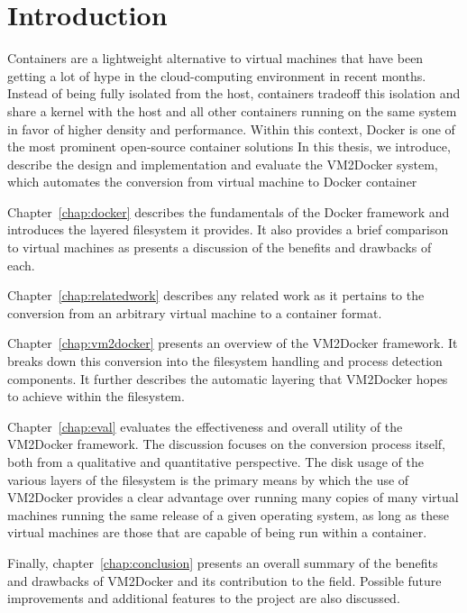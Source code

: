 \chapter{Introduction}

Containers are a lightweight alternative to virtual machines that have been getting a lot of hype in the cloud-computing environment in recent months. Instead of being fully isolated from the host, containers tradeoff this isolation and share a kernel with the host and all other containers running on the same system in favor of higher density and performance. Within this context, Docker is one of the most prominent open-source container solutions In this thesis, we introduce, describe the design and implementation and evaluate the VM2Docker system, which automates the conversion from virtual machine to Docker container

Chapter~\ref{chap:docker} describes the fundamentals of the Docker framework and introduces the layered filesystem it provides. It also provides a brief comparison to virtual machines as presents a discussion of the benefits and drawbacks of each.

Chapter~\ref{chap:relatedwork} describes any related work as it pertains to the conversion from an arbitrary virtual machine to a container format.

Chapter~\ref{chap:vm2docker} presents an overview of the VM2Docker framework. It breaks down this conversion into the filesystem handling and process detection components. It further describes the automatic layering that VM2Docker hopes to achieve within the filesystem.

Chapter~\ref{chap:eval} evaluates the effectiveness and overall utility of the VM2Docker framework. The discussion focuses on the conversion process itself, both from a qualitative and quantitative perspective. The disk usage of the various layers of the filesystem is the primary means by which the use of VM2Docker provides a clear advantage over running many copies of many virtual machines running the same release of a given operating system, as long as these virtual machines are those that are capable of being run within a container.

Finally, chapter~\ref{chap:conclusion} presents an overall summary of the benefits and drawbacks of VM2Docker and its contribution to the field. Possible future improvements and additional features to the project are also discussed.